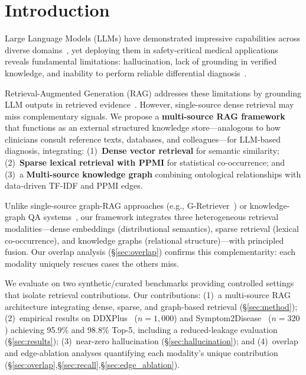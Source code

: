 \documentclass[runningheads]{llncs}
\begin{document}
\section{Introduction}
\label{sec:introduction}

Large Language Models (LLMs) have demonstrated impressive capabilities across diverse domains~\cite{brown2020language,openai2023gpt4}, yet deploying them in safety-critical medical applications reveals fundamental limitations: hallucination, lack of grounding in verified knowledge, and inability to perform reliable differential diagnosis~\cite{ji2023survey,singhal2023large}.

Retrieval-Augmented Generation (RAG) addresses these limitations by grounding LLM outputs in retrieved evidence~\cite{lewis2020retrieval,gao2023retrieval}. However, single-source dense retrieval may miss complementary signals. We propose a \textbf{multi-source RAG framework} that functions as an external structured knowledge store---analogous to how clinicians consult reference texts, databases, and colleagues---for LLM-based diagnosis, integrating: (1)~\textbf{Dense vector retrieval} for semantic similarity; (2)~\textbf{Sparse lexical retrieval with PPMI} for statistical co-occurrence; and (3)~a \textbf{Multi-source knowledge graph} combining ontological relationships with data-driven TF-IDF and PPMI edges.

Unlike single-source graph-RAG approaches (e.g., G-Retriever~\cite{he2024gretriever}) or knowledge-graph QA systems~\cite{pan2024unifying}, our framework integrates three heterogeneous retrieval modalities---dense embeddings (distributional semantics), sparse retrieval (lexical co-occurrence), and knowledge graphs (relational structure)---with principled fusion. Our overlap analysis (\S\ref{sec:overlap}) confirms this complementarity: each modality uniquely rescues cases the others miss.
\label{para:complementarity}

We evaluate on two synthetic/curated benchmarks providing controlled settings that isolate retrieval contributions. Our contributions: (1)~a multi-source RAG architecture integrating dense, sparse, and graph-based retrieval (\S\ref{sec:method}); (2)~empirical results on DDXPlus~\cite{fansi2022ddxplus} ($n{=}1{,}000$) and Symptom2Disease~\cite{gretelai_s2d} ($n{=}320$) achieving 95.9\% and 98.8\% Top-5, including a reduced-leakage evaluation (\S\ref{sec:results}); (3)~near-zero hallucination (\S\ref{sec:hallucination}); and (4)~overlap and edge-ablation analyses quantifying each modality's unique contribution (\S\ref{sec:overlap},\S\ref{sec:recall},\S\ref{sec:edge_ablation}).
\end{document}
